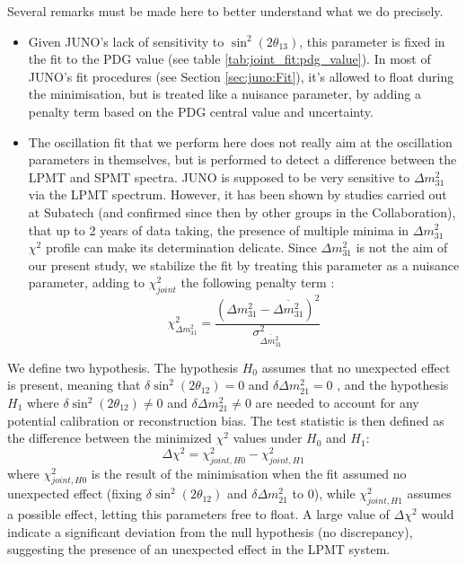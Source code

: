 \documentclass[../main.tex]{subfiles}
\begin{document}
Several remarks must be made here to better understand what we do precisely.
\begin{itemize}
  \item Given JUNO's lack of sensitivity to $\sin^2(2\theta_{13})$, this parameter is fixed in the fit to the PDG value (see table \ref{tab:joint_fit:pdg_value}). In most of JUNO's fit procedures (see Section \ref{sec:juno:Fit}), it's allowed to float during the minimisation, but is treated like a nuisance parameter, by adding a penalty term based on the PDG central value and uncertainty.


 \item The oscillation fit that we perform here does not really aim at the oscillation parameters in themselves, but is performed to detect a difference between the LPMT and SPMT spectra. JUNO is supposed to be very sensitive to $\Delta m^2_{31}$ via the LPMT spectrum. However, it has been shown by studies carried out at Subatech (and confirmed since then by other groups in the Collaboration), that up to 2 years of data taking, the presence of multiple minima in $\Delta m^2_{31}$ $\chi^2$ profile can make its determination delicate. Since $\Delta m^2_{31}$ is not the aim of our present study, we stabilize the fit by treating this parameter as a nuisance parameter, adding to $\chi^2_{joint}$ the following penalty term :
    \begin{equation}
      \chi^2_{\Delta m^2_{31}} = \frac{(\Delta m^2_{31}-\overline{\Delta m^2_{31}})^2}{\sigma^2_{\overline{\Delta m^2_{31}}}}
    \end{equation}
\end{itemize}
\hfill


We define two hypothesis. The hypothesis $H_0$ assumes that no unexpected effect is present, meaning that $\delta \sin^2(2\theta_{12}) = 0$ and $\delta \Delta m^2_{21} = 0$ , and the hypothesis $H_1$  where  $\delta \sin^2(2\theta_{12}) \neq 0$ and $\delta \Delta m^2_{21} \neq 0$ are needed to account for any potential calibration or reconstruction bias.
The test statistic is then defined as the difference between the minimized $\chi^2$ values under $H_0$ and $H_1$:
\begin{equation}
  \Delta \chi^2 = \chi^2_{joint,H0} - \chi^2_{joint, H1}
\end{equation}
where $\chi^2_{joint,H0}$ is the result of the minimisation when the fit assumed no unexpected effect (fixing $\delta \sin^2(2\theta_{12})$ and $\delta \Delta m^2_{21}$ to 0), while $\chi^2_{joint, H1}$ assumes a possible effect, letting this parameters free to float. A large value of $\Delta \chi^2$ would indicate a significant deviation from the null hypothesis (no discrepancy), suggesting the presence of an unexpected effect in the LPMT system.
\end{document}
